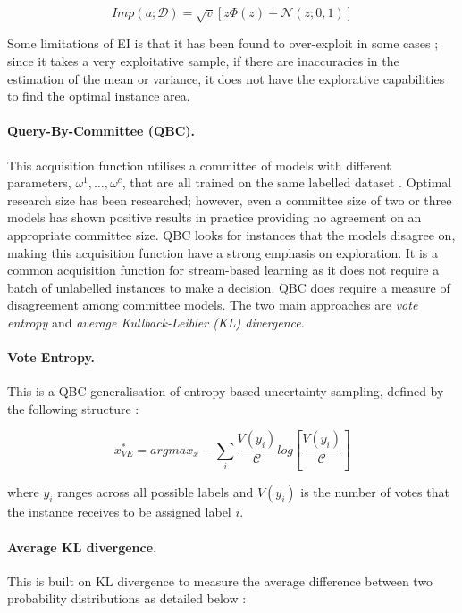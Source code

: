 $$
	Imp(a; \mathcal{D}) = \sqrt{v}\left[z \Phi(z) + \mathcal{N}(z; 0, 1)\right]
$$	

\noindent
Some limitations of EI is that it has been found to over-exploit in some cases \cite{Qin17}; since it takes a very exploitative sample, if there are inaccuracies in the estimation of the mean or variance, it does not have the explorative capabilities to find the optimal instance area.

\paragraph{Query-By-Committee (QBC).} This acquisition function utilises a committee of models with different parameters, ${\omega^1, \ldots, \omega^{c}}$, that are all trained on the same labelled dataset \cite{Seung92}. Optimal research size has been researched; however, even a committee size of two or three models has shown positive results in practice \cite{Seung92, Craven08, Nigam98} providing no agreement on an appropriate committee size. QBC looks for instances that the models disagree on, making this acquisition function have a strong emphasis on exploration. It is a common acquisition function for stream-based learning \cite{Settles09} as it does not require a batch of unlabelled instances to make a decision. QBC does require a measure of disagreement among committee models. The two main approaches are \emph{vote entropy} and \emph{average Kullback-Leibler (KL) divergence}. 

\paragraph{Vote Entropy.} This is a QBC generalisation of entropy-based uncertainty sampling, defined by the following structure \cite{Dagan95}:

$$
	x^\ast_{VE} = argmax_x - \sum_i \frac{V(y_i)}{\mathcal{C}} log \left[\frac{V(y_i)}{\mathcal{C}}\right]
$$

\noindent
where $y_i$ ranges across all possible labels and $V(y_i)$ is the number of votes that the instance receives to be assigned label $i$.

\paragraph{Average KL divergence.} This is built on KL divergence \cite{Kullback51} to measure the average difference between two probability distributions as detailed below \cite{Nigam98}:

